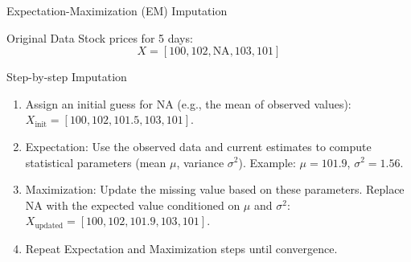 \documentclass{beamer}
\begin{document}
\begin{frame}{Expectation-Maximization (EM) Imputation}
   \begin{block}{Original Data}
       Stock prices for 5 days:
       \[
       X = [100, 102, \text{NA}, 103, 101]
       \]
   \end{block}

   \begin{block}{Step-by-step Imputation}
       \begin{enumerate}
           \item Assign an initial guess for $\text{NA}$ (e.g., the mean of observed values):
           $X_{\text{init}} = [100, 102, 101.5, 103, 101]$.

           \item Expectation: Use the observed data and current estimates to compute statistical parameters (mean $\mu$, variance $\sigma^2$).
           Example: $\mu = 101.9$, $\sigma^2 = 1.56$.

           \item Maximization: Update the missing value based on these parameters. Replace $\text{NA}$ with the expected value conditioned on $\mu$ and $\sigma^2$:\\
           $X_{\text{updated}} = [100, 102, \mathbf{101.9}, 103, 101]$.

           \item Repeat Expectation and Maximization steps until convergence.
       \end{enumerate}
   \end{block}

\end{frame}
\end{document}
